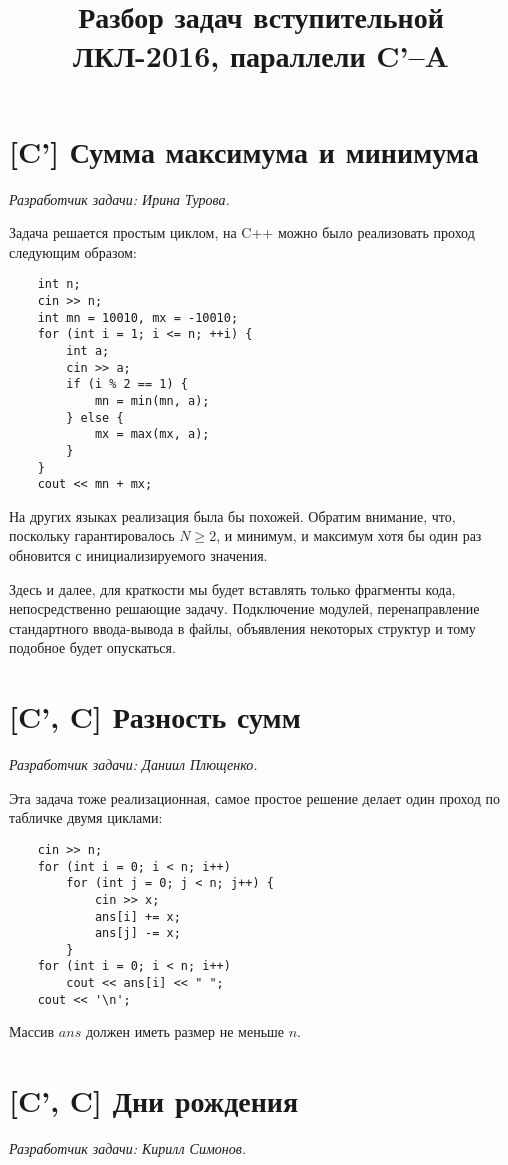 \documentclass[12pt]{article}
\theoremstyle{definition}
\begin{document}
\title{Разбор задач вступительной ЛКЛ-2016, параллели C'--A}
\date{}

\renewcommand{\thesection}{\Alph{section}.}
\maketitle

\tableofcontents
\section{[C'] Сумма максимума и минимума}
\textit{Разработчик задачи: Ирина Турова.}

Задача решается простым циклом, на C++ можно было реализовать проход следующим образом:
\begin{lstlisting}
    int n;
    cin >> n;
    int mn = 10010, mx = -10010;
    for (int i = 1; i <= n; ++i) {
        int a;
        cin >> a;
        if (i % 2 == 1) {
            mn = min(mn, a);
        } else {
            mx = max(mx, a);
        }
    }
    cout << mn + mx;
\end{lstlisting}
На других языках реализация была бы похожей. Обратим внимание, что, поскольку гарантировалось $N \ge 2$, и минимум, и максимум хотя бы один раз обновится с инициализируемого значения.

Здесь и далее, для краткости мы будет вставлять только фрагменты кода, непосредственно
решающие задачу. Подключение модулей, перенаправление стандартного ввода-вывода в файлы,
объявления некоторых структур и тому подобное будет опускаться.


\pagebreak
\section{[C', C] Разность сумм}
\textit{Разработчик задачи: Даниил Плющенко.}

Эта задача тоже реализационная, самое простое решение делает один проход по табличке
двумя циклами:
\begin{lstlisting}
    cin >> n;
    for (int i = 0; i < n; i++)
        for (int j = 0; j < n; j++) {
            cin >> x;
            ans[i] += x;
            ans[j] -= x;
        }
    for (int i = 0; i < n; i++)
        cout << ans[i] << " ";
    cout << '\n';
\end{lstlisting}
Массив $ans$ должен иметь размер не меньше $n$.

\section{[C', C] Дни рождения}
\textit{Разработчик задачи: Кирилл Симонов.}
\end{document}
